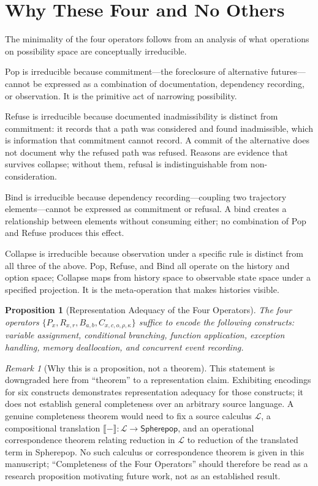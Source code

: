\documentclass[12pt, a4paper, openany]{book}
\theoremstyle{plain}
\newtheorem{proposition}[theorem]{Proposition}
\theoremstyle{definition}
\theoremstyle{remark}
\newtheorem{remark}[theorem]{Remark}
\begin{document}
\section{Why These Four and No Others}

The minimality of the four operators follows from an analysis of what operations
on possibility space are conceptually irreducible.

Pop is irreducible because commitment---the foreclosure of alternative
futures---cannot be expressed as a combination of documentation, dependency
recording, or observation. It is the primitive act of narrowing possibility.

Refuse is irreducible because documented inadmissibility is distinct from
commitment: it records that a path was considered and found inadmissible, which
is information that commitment cannot record. A commit of the alternative does not
document why the refused path was refused. Reasons are evidence that survives
collapse; without them, refusal is indistinguishable from non-consideration.

Bind is irreducible because dependency recording---coupling two trajectory
elements---cannot be expressed as commitment or refusal. A bind creates a
relationship between elements without consuming either; no combination of Pop
and Refuse produces this effect.

Collapse is irreducible because observation under a specific rule is distinct from
all three of the above. Pop, Refuse, and Bind all operate on the history and
option space; Collapse maps from history space to observable state space under
a specified projection. It is the meta-operation that makes histories visible.

\begin{proposition}[Representation Adequacy of the Four Operators]
\label{thm:completeness}
The four operators $\{P_x, R_{x,r}, B_{a,b}, C_{x,c,o,\rho,\kappa}\}$ suffice to
encode the following constructs: variable assignment, conditional branching,
function application, exception handling, memory deallocation, and concurrent
event recording.
\end{proposition}

\begin{remark}[Why this is a proposition, not a theorem]
This statement is downgraded here from ``theorem'' to a representation claim.
Exhibiting encodings for six constructs demonstrates representation adequacy
for those constructs; it does not establish general completeness over an
arbitrary source language. A genuine completeness theorem would need to fix a
source calculus $\mathcal{L}$, a compositional translation
$\llbracket - \rrbracket : \mathcal{L} \to \mathsf{Spherepop}$, and an
operational correspondence theorem relating reduction in $\mathcal{L}$ to
reduction of the translated term in Spherepop. No such calculus or
correspondence theorem is given in this manuscript; ``Completeness of the Four
Operators'' should therefore be read as a research proposition motivating
future work, not as an established result.
\end{remark}
\end{document}

